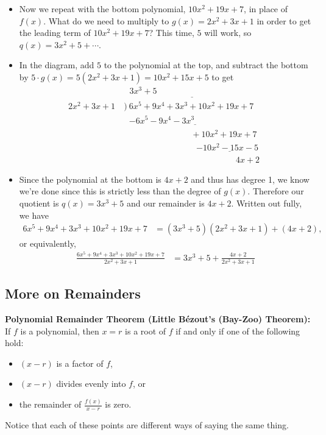 \documentclass{ximera}
\begin{document}
\begin{example}
\begin{explanation}
\begin{itemize}
    \item Now we repeat with the bottom polynomial, $10x^2+19x+7$, in place of $f(x)$. What do we need to multiply to $g(x) = 2x^2+3x+1$ in order to get the leading term of $10x^2+19x+7$? This time, $5$ will work, so $q(x) = 3x^2+5+\cdots$.
    
    \item In the diagram, add $5$ to the polynomial at the top, and subtract the bottom by $5 \cdot g(x) = 5(2x^2+3x+1) = 10x^2+15x+5$ to get
    \begin{align*}
   & \underline{~~~3x^3+5\phantom{somethingssomethingssom}} \\[-4pt]  2x^2+3x+1~&\Big)~6x^5+9x^4+3x^3+10x^2+19x+7 \\[-4pt] &\phantom{\big)~} \underline{-6x^5-9x^4-3x^3\phantom{............................}} \\[-4pt] &\phantom{\Big)~}\phantom{..........................}+10x^2+19x+7 \\[-4pt] &\phantom{\big).............................}\underline{-10x^2-15x-5\phantom{..}} \\[-3pt] &\phantom{...............................................}4x+2
\end{align*}
    
  \item Since the polynomial at the bottom is $4x+2$ and thus has degree 1, we know we're done since this is strictly less than the degree of $g(x)$. Therefore our quotient is $q(x) = 3x^3+5$ and our remainder is $4x + 2$. Written out fully, we have
  \begin{align*}
    6x^5+9x^4+3x^3+10x^2+19x+7 &= (3x^3+5)(2x^2+3x+1) + (4x+2),
  \end{align*}
  or equivalently,
  \begin{align*}
    \frac{6x^5+9x^4+3x^3+10x^2+19x+7}{2x^2+3x+1} &= 3x^3+5 + \frac{4x+2}{2x^2+3x+1}
  \end{align*}
    \end{itemize}
  \end{explanation}
\end{example}

\subsection{More on Remainders}

\begin{callout}
    {\bf Polynomial Remainder Theorem (Little B\'ezout's (Bay-Zoo) Theorem):} 
    If $f$ is a polynomial, then $x=r$ is a root of $f$ if and only if one of the following hold:
    \begin{itemize}
      \item $(x-r)$ is a factor of $f$,
      \item $(x-r)$ divides evenly into $f$, or
      \item the remainder of $\frac{f(x)}{x-r}$ is zero.
    \end{itemize}
    Notice that each of these points are different ways of saying the same thing.
\end{callout}
\end{document}
